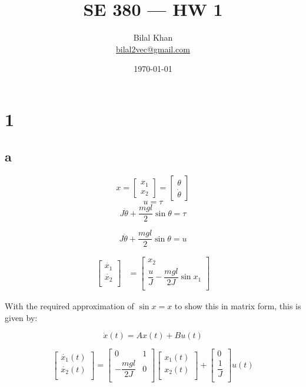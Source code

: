 \documentclass[11pt]{article}
\title{SE 380 — HW 1}
\author{Bilal Khan\\
\href{mailto:bilal2vec@gmail.com}{bilal2vec@gmail.com}}
\date{\today}
\begin{document}
\maketitle

\tableofcontents

\section{1}

\subsection{a}

\[ x = \begin{bmatrix} x_1 \\ x_2 \end{bmatrix} = \begin{bmatrix} \theta \\ \dot{\theta} \end{bmatrix} \]
\[ u = \tau \]
\[ J \ddot{\theta} + \dfrac{mgl}{2} \sin \theta = \tau \]

\[ J \ddot{\theta} + \dfrac{mgl}{2} \sin \theta = u \]

\begin{align*}
    \begin{bmatrix}
        \dot{x_1} \\
        \dot{x_2} \\
    \end{bmatrix}
    &=
    \begin{bmatrix}
        x_2 \\
        \dfrac{u}{J} - \dfrac{mgl}{2J} \sin x_1 \\
    \end{bmatrix}
\end{align*}

With the required approximation of $\sin x = x$ to show this in matrix form, this is given by:

\[ \dot{x}(t) = A x(t) + Bu(t) \]

\[
\begin{bmatrix}
    \dot{x_1}(t) \\
    \dot{x_2}(t) \\
\end{bmatrix}
=
\begin{bmatrix}
    0 & 1 \\
    - \dfrac{mgl}{2J} & 0 \\
\end{bmatrix}
\begin{bmatrix}
    x_1(t) \\
    x_2(t) \\
\end{bmatrix}
+
\begin{bmatrix}
    0 \\
    \dfrac{1}{J} \\
\end{bmatrix}
u(t)
\]
\end{document}
